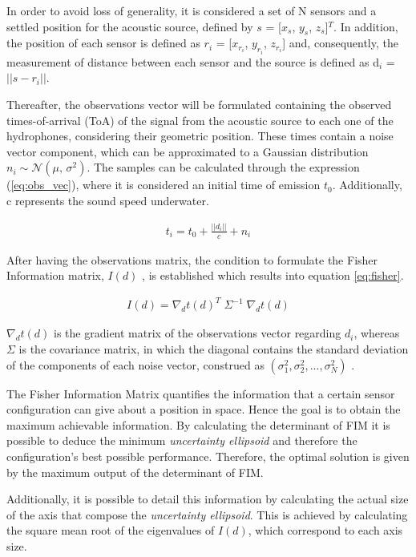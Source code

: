 In order to avoid loss of generality, it is considered a set of N sensors and a settled position for the acoustic source, defined by $s$ = [$x_{s}$, $y_{s}$, $z_{s}$]$^T$. In addition, the position of each sensor is defined as $r_{i}$ = [$x_{r_{i}}$, $y_{r_{i}}$, $z_{r_{i}}$] and, consequently, the measurement of distance between each sensor and the source is defined as d$_{i}$ = $|| s - r_{i} ||$.

Thereafter, the observations vector will be formulated containing the observed times-of-arrival (ToA) of the signal from the acoustic source to each one of the hydrophones, considering their geometric position. These times contain a noise vector component, which can be approximated to a Gaussian distribution $n_i \sim \mathcal{N}(\mu,\,\sigma^{2})$. The samples can be calculated through the expression (\ref{eq:obs_vec}), where it is considered an initial time of emission $t_0$. Additionally, c represents the sound speed underwater.

\begin{eqnarray}
	t_i = t_0 + \frac{||d_i||}{c} + n_i
	\label{eq:obs_vec}
\end{eqnarray}

After having the observations matrix, the condition to formulate the Fisher Information matrix, $I(d)$ , is established which results into equation \ref{eq:fisher}.

\begin{eqnarray}
	I(d) = \nabla_{d}t(d)^T \; \Sigma^{-1} \; \nabla_{d}t(d)
	\label{eq:fisher}
\end{eqnarray}

$\nabla_{d}t(d)$ is the gradient matrix of the observations vector regarding $d_i$, whereas $\Sigma$ is the covariance matrix, in which the diagonal contains the standard deviation of the components of each noise vector, construed as $(\sigma_1^2 , \sigma_2^2 , ... , \sigma_N^2)$ .

The Fisher Information Matrix quantifies the information that a certain sensor configuration can give about a position in space. Hence the goal is to obtain the maximum achievable information. By calculating the determinant of FIM it is possible to deduce the minimum \textit{uncertainty ellipsoid} and therefore the configuration's best possible performance. Therefore, the optimal solution is given by the maximum output of the determinant of FIM.

Additionally, it is possible to detail this information by calculating the actual size of the axis that compose the \textit{uncertainty ellipsoid}. This is achieved by calculating the square mean root of the eigenvalues of $I(d)$, which correspond to each axis size.

